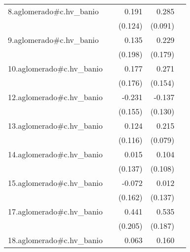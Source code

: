 {\begin{longtable}{l*{4}{D{.}{.}{-1}}}
\addlinespace
8.aglomerado#c.hv\_banio&                     &       0.191         &       0.285\sym{**} &                     \\
            &                     &     (0.124)         &     (0.091)         &                     \\
\addlinespace
9.aglomerado#c.hv\_banio&                     &       0.135         &       0.229         &                     \\
            &                     &     (0.198)         &     (0.179)         &                     \\
\addlinespace
10.aglomerado#c.hv\_banio&                     &       0.177         &       0.271         &                     \\
            &                     &     (0.176)         &     (0.154)         &                     \\
\addlinespace
12.aglomerado#c.hv\_banio&                     &      -0.231         &      -0.137         &                     \\
            &                     &     (0.155)         &     (0.130)         &                     \\
\addlinespace
13.aglomerado#c.hv\_banio&                     &       0.124         &       0.215\sym{**} &                     \\
            &                     &     (0.116)         &     (0.079)         &                     \\
\addlinespace
14.aglomerado#c.hv\_banio&                     &       0.015         &       0.104         &                     \\
            &                     &     (0.137)         &     (0.108)         &                     \\
\addlinespace
15.aglomerado#c.hv\_banio&                     &      -0.072         &       0.012         &                     \\
            &                     &     (0.162)         &     (0.137)         &                     \\
\addlinespace
17.aglomerado#c.hv\_banio&                     &       0.441\sym{*}  &       0.535\sym{**} &                     \\
            &                     &     (0.205)         &     (0.187)         &                     \\
\addlinespace
18.aglomerado#c.hv\_banio&                     &       0.063         &       0.160\sym{*}  &                     \\

\end{longtable}}
